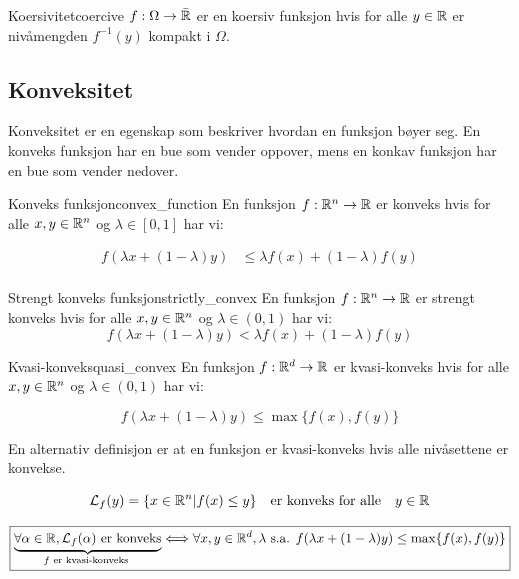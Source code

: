 \documentclass[10pt, a4paper]{article}
\begin{document}
\begin{definition}{Koersivitet}{coercive}
  \(f: \Omega \to \bar{\mathbb{R}}\) er en koersiv funksjon hvis for alle \(y \in \mathbb{R}\) er nivåmengden \(f^{-1}(y)\) kompakt i \(\Omega\).
\end{definition}

\subsection{Konveksitet}

Konveksitet er en egenskap som beskriver hvordan en funksjon bøyer seg.
En konveks funksjon har en bue som vender oppover, mens en konkav funksjon har en bue som vender nedover.

\begin{definition}{Konveks funksjon}{convex_function}
  En funksjon \(f: \mathbb{R}^n \to \mathbb{R}\) er konveks hvis for alle \(x, y \in \mathbb{R}^n\) og \(\lambda \in [0, 1]\) har vi:

  \begin{align*}
    f(\lambda x + (1 - \lambda)y) & \leq \lambda f(x) + (1 - \lambda)f(y) \\
  \end{align*}

\end{definition}
\begin{remark}{Strengt konveks funksjon}{strictly_convex}
  En funksjon \(f: \mathbb{R}^n \to \mathbb{R}\) er strengt konveks hvis for alle \(x, y \in \mathbb{R}^n\) og \(\lambda \in (0, 1)\) har vi:
  \[
    f(\lambda x + (1 - \lambda)y) < \lambda f(x) + (1 - \lambda)f(y)
  \]
\end{remark}

\begin{remark}{Kvasi-konveks}{quasi_convex}
  En funksjon \(f: \mathbb{R}^d \to \mathbb{R}\) er kvasi-konveks hvis for alle \(x, y \in \mathbb{R}^n\) og \(\lambda \in (0, 1)\) har vi:

  \[
    f(\lambda x + (1 - \lambda)y) \leq \max\{f(x), f(y)\}
  \]

  En alternativ definisjon er at en funksjon er kvasi-konveks hvis alle nivåsettene er konvekse.

  \[
    \mathcal{L}_f(y) = \{x \in \mathbb{R}^n | f(x) \leq y\} \quad \text{er konveks for alle} \quad y \in \mathbb{R}
  \]

  \[
    \boxed{\underbrace{\forall \alpha \in \mathbb{R}, \mathcal{L}_f(\alpha) \text{ er konveks}}_{f \text{ er kvasi-konveks }}\Longleftrightarrow \forall x, y \in \mathbb{R}^d,\lambda \text{ s.a. } f(\lambda x + (1-\lambda)y) \leq \max \{ f(x), f(y) \}}
  \]
\end{remark}
\end{document}
